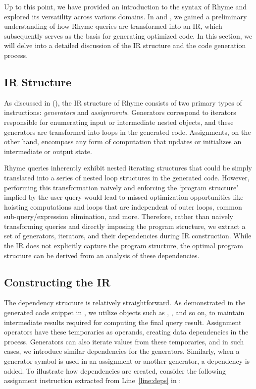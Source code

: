 \documentclass[runningheads]{llncs}
\newcommand{\lang}{Rhyme}
\begin{document}
Up to this point, we have provided an introduction to the syntax of
\lang{} and explored its versatility across various domains.
In  and , we gained a preliminary understanding
of how \lang{} queries are transformed into an IR, which subsequently serves
as the basis for generating optimized code.
In this section, we will delve into a detailed discussion of the IR structure
and the code generation process.

\subsection{IR Structure}\label{subsec:ir}

As discussed in  (), the IR structure of \lang{} consists of two
primary types of instructions: \emph{generators} and \emph{assignments}.
Generators correspond to iterators responsible for enumerating input or intermediate
nested objects, and these generators are transformed into loops in the generated code.
Assignments, on the other hand, encompass any form of computation that updates or
initializes an intermediate or output state.

\lang{} queries inherently exhibit nested iterating structures that could be simply
translated into a series of nested loop structures in the generated code.
However, performing this transformation naively and enforcing the `program structure'
implied by the user query would lead to missed optimization opportunities like
hoisting computations and loops that are independent of outer loops,
common sub-query/expression elimination, and more.
Therefore, rather than naively transforming queries and directly imposing the program
structure, we extract a set of generators, iterators, and their dependencies during
IR construction.
While the IR does not explicitly capture the program structure, the optimal program
structure can be derived from an analysis of these dependencies.

\subsection{Constructing the IR}

The dependency structure is relatively straightforward.
As demonstrated in the generated code snippet in , we utilize objects such
as , , and so on, to maintain intermediate results required
for computing the final query result.
Assignment operators have these temporaries as operands, creating data dependencies in the
process.
Generators can also iterate values from these temporaries, and in such cases, we introduce
similar dependencies for the generators.
Similarly, when a generator symbol is used in an assignment or another generator, a
dependency is added.
To illustrate how dependencies are created, consider the following assignment instruction
extracted from Line~\ref{line:deps} in :
\end{document}
